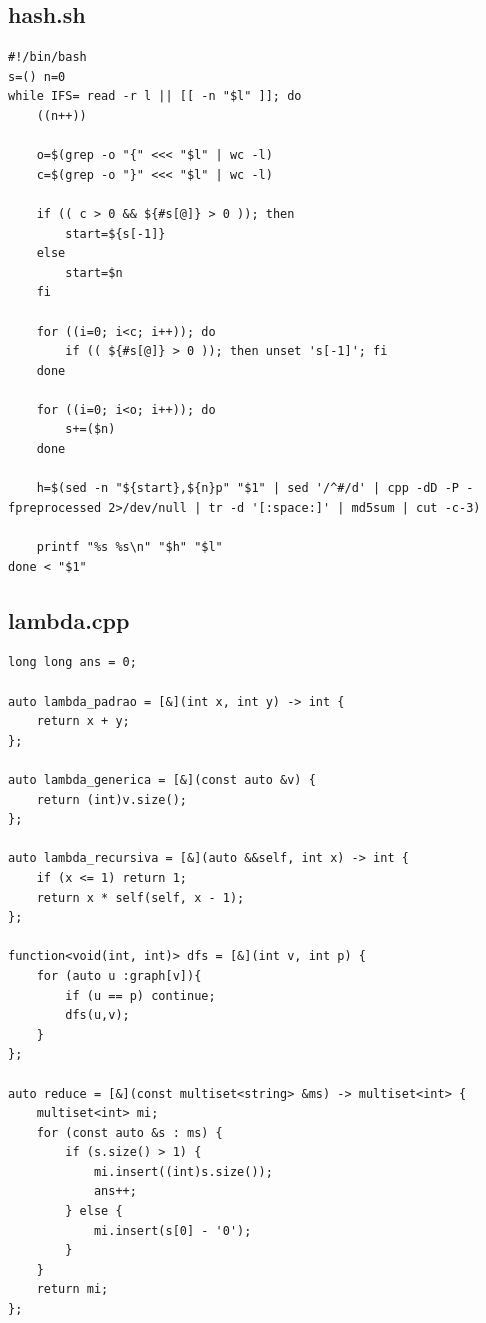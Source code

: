 \documentclass[11pt, a4paper, twoside]{article}
\begin{document}
\subsection{hash.sh}
\begin{lstlisting}
#!/bin/bash
s=() n=0
while IFS= read -r l || [[ -n "$l" ]]; do
    ((n++))

    o=$(grep -o "{" <<< "$l" | wc -l)
    c=$(grep -o "}" <<< "$l" | wc -l)

    if (( c > 0 && ${#s[@]} > 0 )); then
        start=${s[-1]}
    else
        start=$n
    fi

    for ((i=0; i<c; i++)); do
        if (( ${#s[@]} > 0 )); then unset 's[-1]'; fi
    done

    for ((i=0; i<o; i++)); do
        s+=($n)
    done

    h=$(sed -n "${start},${n}p" "$1" | sed '/^#/d' | cpp -dD -P -fpreprocessed 2>/dev/null | tr -d '[:space:]' | md5sum | cut -c-3)

    printf "%s %s\n" "$h" "$l"
done < "$1"
\end{lstlisting}

\subsection{lambda.cpp}
\begin{lstlisting}
long long ans = 0;

auto lambda_padrao = [&](int x, int y) -> int {
    return x + y;
};

auto lambda_generica = [&](const auto &v) {
    return (int)v.size();
};

auto lambda_recursiva = [&](auto &&self, int x) -> int {
    if (x <= 1) return 1;
    return x * self(self, x - 1);
};

function<void(int, int)> dfs = [&](int v, int p) {
    for (auto u :graph[v]){
        if (u == p) continue;
        dfs(u,v);
    }
};

auto reduce = [&](const multiset<string> &ms) -> multiset<int> {
    multiset<int> mi;
    for (const auto &s : ms) {
        if (s.size() > 1) {
            mi.insert((int)s.size());
            ans++;
        } else {
            mi.insert(s[0] - '0');
        }
    }
    return mi;
};

\end{lstlisting}
\end{document}
